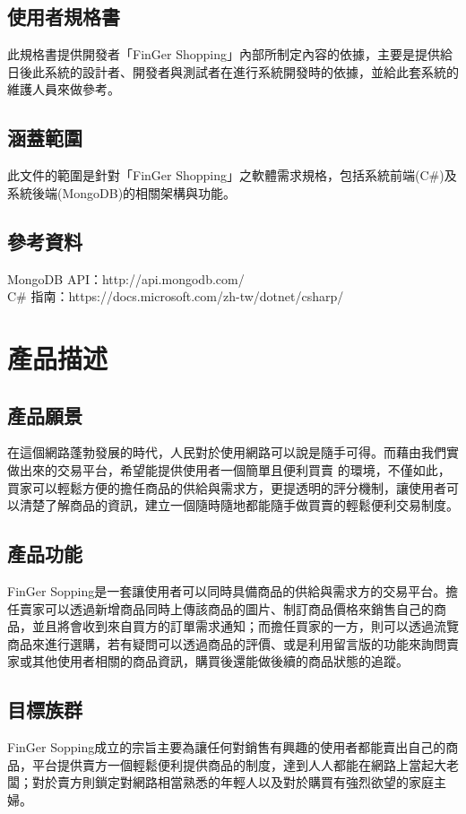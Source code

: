 \documentclass{scrreprt}
\begin{document}
\begin{CJK}{UTF8}{bkai}
\section{使用者規格書}
\qquad 此規格書提供開發者「FinGer Shopping」內部所制定內容的依據，主要是提供給日後此系統的設計者、開發者與測試者在進行系統開發時的依據，並給此套系統的維護人員來做參考。

\section{涵蓋範圍}
\qquad 此文件的範圍是針對「FinGer Shopping」之軟體需求規格，包括系統前端(C\#)及系統後端(MongoDB)的相關架構與功能。

\section{參考資料}
MongoDB API：http://api.mongodb.com/ \\
C\# 指南：https://docs.microsoft.com/zh-tw/dotnet/csharp/ \\


\chapter{產品描述}

\section{產品願景}
\qquad 在這個網路蓬勃發展的時代，人民對於使用網路可以說是隨手可得。而藉由我們實做出來的交易平台，希望能提供使用者一個簡單且便利買賣
的環境，不僅如此，買家可以輕鬆方便的擔任商品的供給與需求方，更提透明的評分機制，讓使用者可以清楚了解商品的資訊，建立一個隨時隨地都能隨手做買賣的輕鬆便利交易制度。

\section{產品功能}
\qquad FinGer Sopping是一套讓使用者可以同時具備商品的供給與需求方的交易平台。擔任賣家可以透過新增商品同時上傳該商品的圖片、制訂商品價格來銷售自己的商品，並且將會收到來自買方的訂單需求通知；而擔任買家的一方，則可以透過流覽商品來進行選購，若有疑問可以透過商品的評價、或是利用留言版的功能來詢問賣家或其他使用者相關的商品資訊，購買後還能做後續的商品狀態的追蹤。

\section{目標族群}
\qquad FinGer Sopping成立的宗旨主要為讓任何對銷售有興趣的使用者都能賣出自己的商品，平台提供賣方一個輕鬆便利提供商品的制度，達到人人都能在網路上當起大老闆；對於賣方則鎖定對網路相當熟悉的年輕人以及對於購買有強烈欲望的家庭主婦。


\end{CJK}
\end{document}
